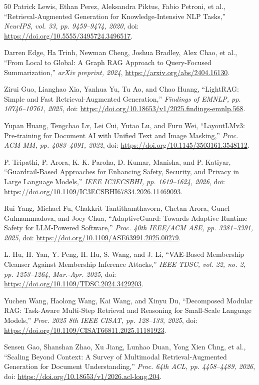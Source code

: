 \documentclass[conference,a4paper]{IEEEtran}
\begin{document}
\begin{thebibliography}{50}
 Patrick Lewis, Ethan Perez, Aleksandra Piktus, Fabio Petroni, et al., ``Retrieval-Augmented Generation for Knowledge-Intensive NLP Tasks,'' \emph{NeurIPS, vol. 33, pp. 9459--9474, 2020}, doi: \url{https://doi.org/10.5555/3495724.3496517}.

 Darren Edge, Ha Trinh, Newman Cheng, Joshua Bradley, Alex Chao, et al., ``From Local to Global: A Graph RAG Approach to Query-Focused Summarization,'' \emph{arXiv preprint, 2024}, \url{https://arxiv.org/abs/2404.16130}.

 Zirui Guo, Lianghao Xia, Yanhua Yu, Tu Ao, and Chao Huang, ``LightRAG: Simple and Fast Retrieval-Augmented Generation,'' \emph{Findings of EMNLP, pp. 10746--10761, 2025}, doi: \url{https://doi.org/10.18653/v1/2025.findings-emnlp.568}.

 Yupan Huang, Tengchao Lv, Lei Cui, Yutao Lu, and Furu Wei, ``LayoutLMv3: Pre-training for Document AI with Unified Text and Image Masking,'' \emph{Proc. ACM MM, pp. 4083--4091, 2022}, doi: \url{https://doi.org/10.1145/3503161.3548112}.

 P. Tripathi, P. Arora, K. K. Paroha, D. Kumar, Manisha, and P. Katiyar, ``Guardrail-Based Approaches for Enhancing Safety, Security, and Privacy in Large Language Models,'' \emph{IEEE IC3ECSBHI, pp. 1619--1624, 2026}, doi: \url{https://doi.org/10.1109/IC3ECSBHI67834.2026.11469093}.

 Rui Yang, Michael Fu, Chakkrit Tantithamthavorn, Chetan Arora, Gunel Gulmammadova, and Joey Chua, ``AdaptiveGuard: Towards Adaptive Runtime Safety for LLM-Powered Software,'' \emph{Proc. 40th IEEE/ACM ASE, pp. 3381--3391, 2025}, doi: \url{https://doi.org/10.1109/ASE63991.2025.00279}.

 L. Hu, H. Yan, Y. Peng, H. Hu, S. Wang, and J. Li, ``VAE-Based Membership Cleanser Against Membership Inference Attacks,'' \emph{IEEE TDSC, vol. 22, no. 2, pp. 1253--1264, Mar.-Apr. 2025}, doi: \url{https://doi.org/10.1109/TDSC.2024.3429203}.

 Yuchen Wang, Haolong Wang, Kai Wang, and Xinyu Du, ``Decomposed Modular RAG: Task-Aware Multi-Step Retrieval and Reasoning for Small-Scale Language Models,'' \emph{Proc. 2025 8th IEEE CISAT, pp. 128--133, 2025}, doi: \url{https://doi.org/10.1109/CISAT66811.2025.11181923}.

 Sensen Gao, Shanshan Zhao, Xu Jiang, Lunhao Duan, Yong Xien Chng, et al., ``Scaling Beyond Context: A Survey of Multimodal Retrieval-Augmented Generation for Document Understanding,'' \emph{Proc. 64th ACL, pp. 4458--4489, 2026}, doi: \url{https://doi.org/10.18653/v1/2026.acl-long.204}.


\end{thebibliography}
\end{document}
